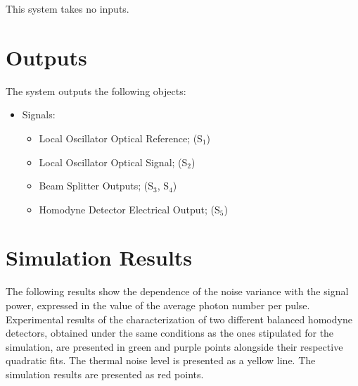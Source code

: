 \documentclass[a4paper]{article}
\begin{document}
This system takes no inputs.

\pagebreak
\section{Outputs}

The system outputs the following objects:
\begin{itemize}
\item Signals:
\begin{itemize}
\item Local Oscillator Optical Reference; (S$_{1}$)
\item Local Oscillator Optical Signal; (S$_{2}$)
\item Beam Splitter Outputs; (S$_{3}$, S$_{4}$)
\item Homodyne Detector Electrical Output; (S$_{5}$)
\end{itemize}
\end{itemize}	

\section{Simulation Results}\label{subsec:SHresults}

The following results show the dependence of the noise variance with the signal power, expressed in the value of the average photon number per pulse. Experimental results of the characterization of two different balanced homodyne detectors, obtained under the same conditions as the ones stipulated for the simulation, are presented in green and purple points alongside their respective quadratic fits. The thermal noise level is presented as a yellow line. The simulation results are presented as red points.
\end{document}
